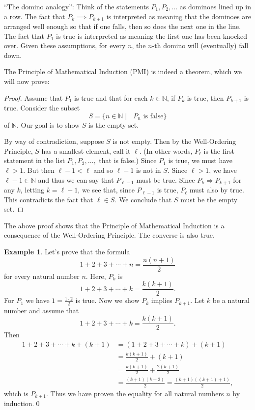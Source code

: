 \documentclass[12pt]{amsart}
\newcommand{\N}{\mathbb{N}}
\numberwithin{equation}{section}
\theoremstyle{plain} %
\theoremstyle{definition}
\newtheorem{ex}[equation]{Example}
\theoremstyle{remark}
\begin{document}
``The domino analogy'': Think of the statements $P_1, P_2, \dots$ as dominoes lined up in a row. The fact that $P_k \implies P_{k+1}$ is interpreted as meaning
that the dominoes
are arranged well enough so that if one falls, then so does the next one in the line. The fact that $P_1$ is true is interpreted as meaning the first one has been knocked
over. Given these assumptions, for every $n$, the $n$-th domino will (eventually) fall down. 



The Principle of Mathematical Induction (PMI) is indeed a theorem, which we will now prove:

\begin{proof} 
Assume that $P_1$ is true and that for each $k
  \in \N$, if $P_k$ is true, then $P_{k+1}$ is true.
Consider the subset
$$
S = \{n \in \N \mid \text{ $P_n$ is false} \}
$$
of $\N$. Our goal is to show $S$ is the empty set. 

By way of contradiction, suppose $S$ is not empty. Then
by the Well-Ordering Principle, $S$ has a smallest element, call it $\ell$. (In other words, $P_\ell$ is the first statement in the list $P_1, P_2, \dots, $
that is false.) Since $P_1$ is true, we must have $\ell > 1$. But then
$\ell-1 < \ell$ and so $\ell-1$ is not in $S$. Since $\ell > 1$, we have $\ell-1 \in
\N$ and thus we can say that $P_{\ell-1}$ must be true. 
Since $P_k \Rightarrow P_{k+1}$ for any $k$,  letting $k = \ell-1$, we see that, since $P_{\ell-1}$ is true, $P_{\ell}$ must also by true. This contradicts the fact that $\ell \in S$. We
conclude that $S$ must be the empty set.
\end{proof}

The above proof shows that the Principle of Mathematical Induction is a consequence of the Well-Ordering Principle. The converse is also true.

\begin{ex}
Let's prove that the formula
\[ 1 + 2 + 3 + \cdots + n = \frac{n(n+1)}{2}\]
for every natural number $n$.
Here, $P_k$ is
\[ 1 + 2 + 3 + \cdots + k = \frac{k(k+1)}{2}.\]
For $P_1$ we have $1 = \frac{1 \cdot 2}{2}$ is true. Now we show $P_k$ implies $P_{k+1}$. Let $k$ be a natural number and assume that 
\[ 1 + 2 + 3 + \cdots + k = \frac{k(k+1)}{2}.\] Then 
\begin{align*} 1 + 2 + 3 + \cdots + k + (k+1) &= (1 + 2 + 3 + \cdots + k )+ (k+1) \\&= \frac{k(k+1)}{2} + (k+1) \\&=  \frac{k(k+1)}{2} + \frac{2(k+1)}{2} \\& = \frac{(k+1)(k+2)}{2} = \frac{(k+1)((k+1)+1)}{2},\end{align*}
which is $P_{k+1}$. Thus we have proven the equality for all natural numbers $n$ by induction.\qed
\end{ex}
\end{document}
